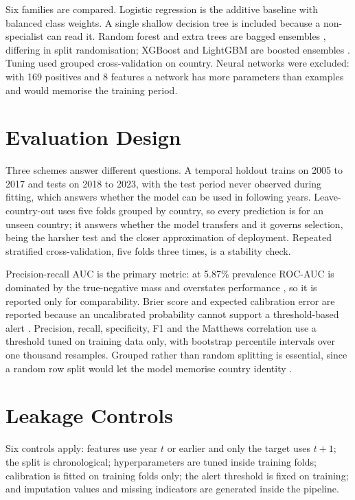 \documentclass[10pt,openany]{report}
\begin{document}
Six families are compared. Logistic regression is the additive baseline with balanced class weights.
A single shallow decision tree is included because a non-specialist can read it. Random forest and
extra trees are bagged ensembles \cite{breiman2001}, differing in split randomisation; XGBoost and
LightGBM are boosted ensembles \cite{chen2016,ke2017}. Tuning used grouped cross-validation on
country. Neural networks were excluded: with 169 positives and 8 features a network
has more parameters than examples and would memorise the training period.

\section{Evaluation Design}

Three schemes answer different questions. A temporal holdout trains on 2005 to 2017 and tests on 2018
to 2023, with the test period never observed during fitting, which answers whether the model can be
used in following years. Leave-country-out uses five folds grouped by country, so every prediction is
for an unseen country; it answers whether the model transfers and it governs selection, being the
harsher test and the closer approximation of deployment. Repeated stratified cross-validation, five
folds three times, is a stability check.

Precision-recall AUC is the primary metric: at 5.87\% prevalence ROC-AUC is dominated by the
true-negative mass and overstates performance \cite{saito2015,davis2006}, so it is reported only for
comparability. Brier score and expected calibration error are reported because an uncalibrated
probability cannot support a threshold-based alert \cite{niculescu2005,huang2020}. Precision, recall,
specificity, F1 and the Matthews correlation use a threshold tuned on training data only, with
bootstrap percentile intervals over one thousand resamples. Grouped rather than random splitting is
essential, since a random row split would let the model memorise country identity \cite{roberts2017}.

\section{Leakage Controls}

Six controls apply: features use year $t$ or earlier and only the target uses $t+1$; the split is
chronological; hyperparameters are tuned inside training folds; calibration is fitted on training
folds only; the alert threshold is fixed on training; and imputation values and missing indicators
are generated inside the pipeline.
\end{document}
